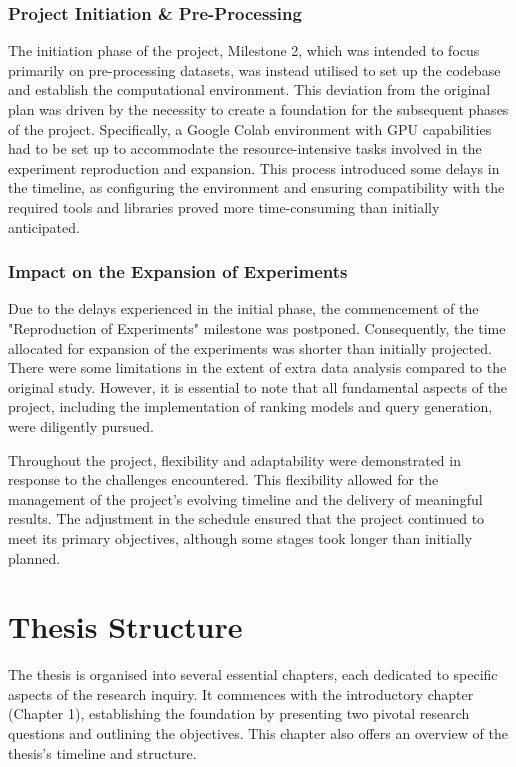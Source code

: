\subsubsection{Project Initiation \& Pre-Processing}
The initiation phase of the project, Milestone 2, which was intended to focus primarily on pre-processing datasets, was instead utilised to set up the codebase and establish the computational environment. This deviation from the original plan was driven by the necessity to create a foundation for the subsequent phases of the project. Specifically, a Google Colab environment with GPU capabilities had to be set up to accommodate the resource-intensive tasks involved in the experiment reproduction and expansion. This process introduced some delays in the timeline, as configuring the environment and ensuring compatibility with the required tools and libraries proved more time-consuming than initially anticipated.

\subsubsection{Impact on the Expansion of Experiments}
Due to the delays experienced in the initial phase, the commencement of the "Reproduction of Experiments" milestone was postponed. Consequently, the time allocated for expansion of the experiments was shorter than initially projected. There were some limitations in the extent of extra data analysis compared to the original study. However, it is essential to note that all fundamental aspects of the project, including the implementation of ranking models and query generation, were diligently pursued.

Throughout the project, flexibility and adaptability were demonstrated in response to the challenges encountered. This flexibility allowed for the management of the project's evolving timeline and the delivery of meaningful results. The adjustment in the schedule ensured that the project continued to meet its primary objectives, although some stages took longer than initially planned.

\section{Thesis Structure}
The thesis is organised into several essential chapters, each dedicated to specific aspects of the research inquiry. It commences with the introductory chapter (Chapter 1), establishing the foundation by presenting two pivotal research questions and outlining the objectives. This chapter also offers an overview of the thesis's timeline and structure.

